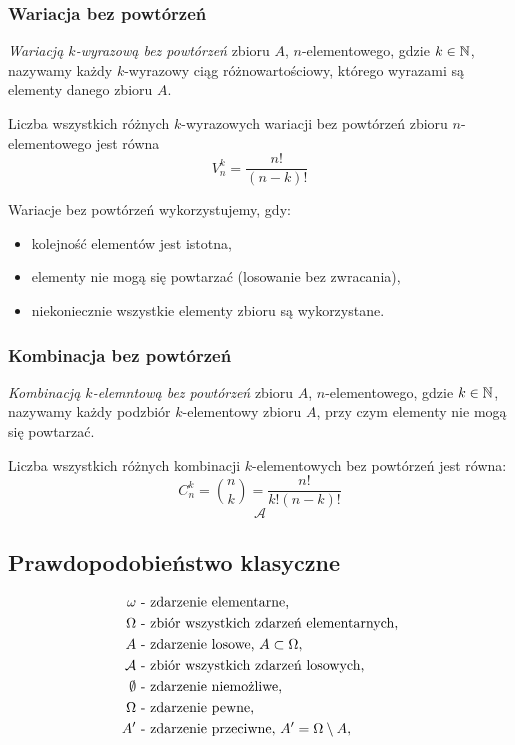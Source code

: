 \documentclass[../Matematyka.tex]{subfiles}
\begin{document}
\newpage
\subsubsection{Wariacja bez powtórzeń}
\textit{Wariacją \(k\)-wyrazową bez powtórzeń} zbioru \(A\), \(n\)-elementowego, gdzie \(k\in\mathbb{N}\),
nazywamy każdy \(k\)-wyrazowy ciąg różnowartościowy, którego wyrazami są elementy danego zbioru \(A\).

Liczba wszystkich różnych \(k\)-wyrazowych wariacji bez powtórzeń zbioru \(n\)-elementowego jest równa
\[V_n^k=\frac{n!}{(n-k)!}\]

Wariacje bez powtórzeń wykorzystujemy, gdy:
\begin{itemize}
    \item kolejność elementów jest istotna,
    \item elementy nie mogą się powtarzać (losowanie bez zwracania),
    \item niekoniecznie wszystkie elementy zbioru są wykorzystane.
\end{itemize}

\subsubsection{Kombinacja bez powtórzeń}
\textit{Kombinacją \(k\)-elemntową bez powtórzeń} zbioru \(A\), \(n\)-elementowego, gdzie \(k\in\mathbb{N}\),
nazywamy każdy podzbiór \(k\)-elementowy zbioru \(A\), przy czym elementy nie mogą się powtarzać.

Liczba wszystkich różnych kombinacji \(k\)-elementowych bez powtórzeń jest równa:
\[C_n^k=\binom{n}{k}=\frac{n!}{k!(n-k)!}\]
\[\mathcal{A}\]

\subsection{Prawdopodobieństwo klasyczne}
\begin{align*}
    \omega      & \text{ - zdarzenie elementarne,}                             \\
    \Omega      & \text{ - zbiór wszystkich zdarzeń elementarnych,}            \\
    A           & \text{ - zdarzenie losowe, } A \subset \Omega,               \\
    \mathcal{A} & \text{ - zbiór wszystkich zdarzeń losowych,}                 \\
    \emptyset   & \text{ - zdarzenie niemożliwe,}                              \\
    \Omega      & \text{ - zdarzenie pewne,}                                   \\
    A^\prime      & \text{ - zdarzenie przeciwne, } A^\prime = \Omega \setminus A, \\
\end{align*}
\end{document}
